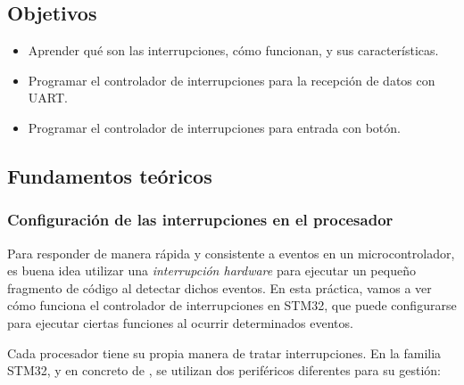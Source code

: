 \documentclass[../main.tex]{subfiles}
\begin{document}

    \subsection{Objetivos}
        \begin{itemize}
            \item Aprender qué son las interrupciones, cómo funcionan, y sus características.
            \item Programar el controlador de interrupciones para la recepción de datos con UART.
            \item Programar el controlador de interrupciones para entrada con botón.
        \end{itemize}

    \subsection{Fundamentos teóricos}
        
        \subsubsection{Configuración de las interrupciones en el procesador}

            Para responder de manera rápida y consistente a eventos en un microcontrolador, es buena idea utilizar una \emph{interrupción hardware} para ejecutar un pequeño fragmento de código al detectar dichos eventos. En esta práctica, vamos a ver cómo funciona el controlador de interrupciones en STM32, que puede configurarse para ejecutar ciertas funciones al ocurrir determinados eventos.

            Cada procesador tiene su propia manera de tratar interrupciones. En la familia STM32, y en concreto de \MCU, se utilizan dos periféricos diferentes para su gestión:
\end{document}
